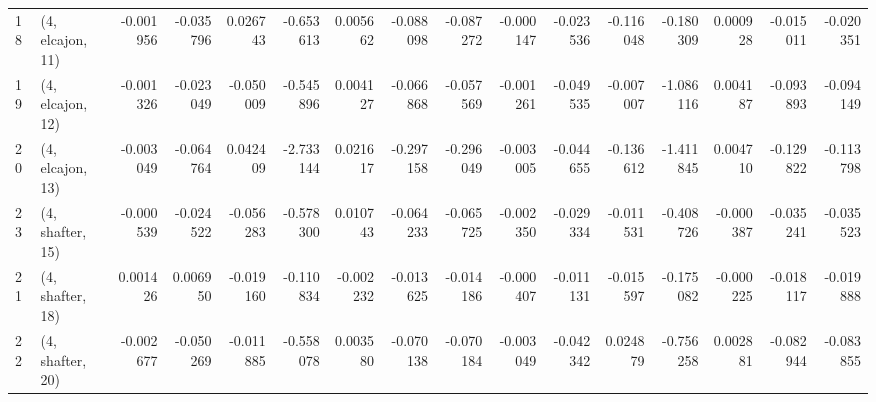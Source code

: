 \begin{tabular}{llrrrrrrrrrrrrrr}
18 &  (4, elcajon, 11) &  -0.001956 & -0.035796 &  0.026743 &  -0.653613 &  0.005662 &  -0.088098 & -0.087272 & -0.000147 & -0.023536 & -0.116048 &  -0.180309 &  0.000928 & -0.015011 & -0.020351 \\
19 &  (4, elcajon, 12) &  -0.001326 & -0.023049 & -0.050009 &  -0.545896 &  0.004127 &  -0.066868 & -0.057569 & -0.001261 & -0.049535 & -0.007007 &  -1.086116 &  0.004187 & -0.093893 & -0.094149 \\
20 &  (4, elcajon, 13) &  -0.003049 & -0.064764 &  0.042409 &  -2.733144 &  0.021617 &  -0.297158 & -0.296049 & -0.003005 & -0.044655 & -0.136612 &  -1.411845 &  0.004710 & -0.129822 & -0.113798 \\
23 &  (4, shafter, 15) &  -0.000539 & -0.024522 & -0.056283 &  -0.578300 &  0.010743 &  -0.064233 & -0.065725 & -0.002350 & -0.029334 & -0.011531 &  -0.408726 & -0.000387 & -0.035241 & -0.035523 \\
21 &  (4, shafter, 18) &   0.001426 &  0.006950 & -0.019160 &  -0.110834 & -0.002232 &  -0.013625 & -0.014186 & -0.000407 & -0.011131 & -0.015597 &  -0.175082 & -0.000225 & -0.018117 & -0.019888 \\
22 &  (4, shafter, 20) &  -0.002677 & -0.050269 & -0.011885 &  -0.558078 &  0.003580 &  -0.070138 & -0.070184 & -0.003049 & -0.042342 &  0.024879 &  -0.756258 &  0.002881 & -0.082944 & -0.083855 \\
\bottomrule
\end{tabular}
